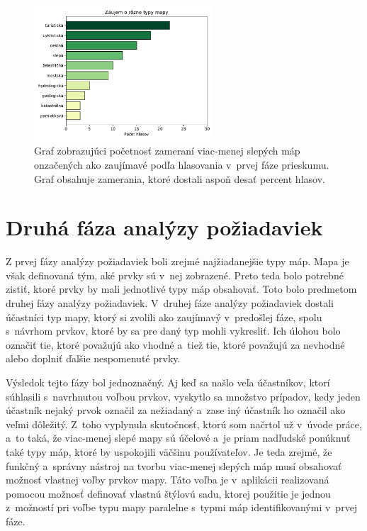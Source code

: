 \begin{figure}[hbt]
	\centering
	\includegraphics[width=0.6\textwidth]{obrazky-figures/map_type_vote.pdf}
	\caption{Graf zobrazujúci početnosť zameraní viac-menej slepých máp onzačených ako zaujímavé podľa hlasovania v~prvej fáze prieskumu. Graf obsahuje zamerania, ktoré dostali aspoň desať percent hlasov.}
	\label{graph_voting}
\end{figure}

\section{Druhá fáza analýzy požiadaviek}
Z prvej fázy analýzy požiadaviek boli zrejmé najžiadanejšie typy máp. Mapa je však definovaná tým, aké prvky sú v~nej zobrazené. Preto teda bolo potrebné zistiť, ktoré prvky by mali jednotlivé typy máp obsahovať. Toto bolo predmetom druhej fázy analýzy požiadaviek. V~druhej fáze analýzy požiadaviek dostali účastníci typ mapy, ktorý si zvolili ako zaujímavý v~predošlej fáze, spolu s~návrhom prvkov, ktoré by sa pre daný typ mohli vykresliť. Ich úlohou bolo označiť tie, ktoré považujú ako vhodné a~tiež tie, ktoré považujú za nevhodné alebo doplniť ďalšie nespomenuté prvky.

Výsledok tejto fázy bol jednoznačný. Aj keď sa našlo veľa účastníkov, ktorí súhlasili s~navrhnutou voľbou prvkov, vyskytlo sa množstvo prípadov, kedy jeden účastník nejaký prvok označil za nežiadaný a~zase iný účastník ho označil ako veľmi dôležitý. Z~toho vyplynula skutočnosť, ktorú som načrtol už v~úvode práce, a~to taká, že viac-menej slepé mapy sú účelové a~je priam nadľudské ponúknuť také typy máp, ktoré by uspokojili väčšinu používateľov. Je teda zrejmé, že funkčný a~správny nástroj na tvorbu viac-menej slepých máp musí obsahovať možnosť vlastnej voľby prvkov mapy. Táto voľba je v~aplikácii realizovaná pomocou možnosť definovať vlastnú štýlovú sadu, ktorej použitie je jednou z~možností pri voľbe typu mapy paralelne s~typmi máp identifikovanými v~prvej fáze.

